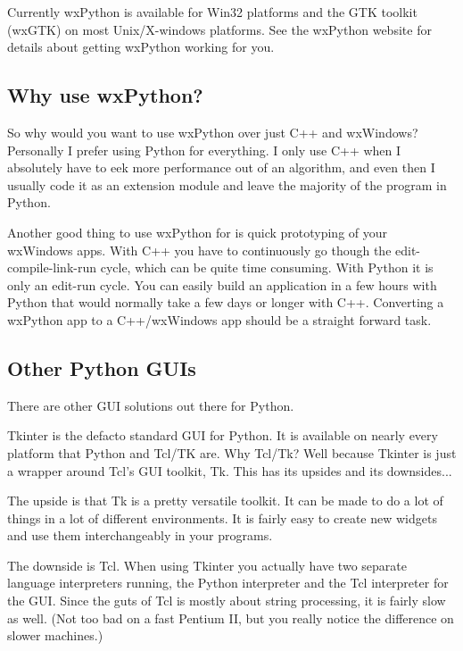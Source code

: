 Currently wxPython is available for Win32 platforms and the GTK
toolkit (wxGTK) on most Unix/X-windows platforms. See the wxPython
website  for
details about getting wxPython working for you.

\subsection{Why use wxPython?}\label{wxpwhy}

So why would you want to use wxPython over just C++ and wxWindows?
Personally I prefer using Python for everything. I only use C++ when I
absolutely have to eek more performance out of an algorithm, and even
then I usually code it as an extension module and leave the majority
of the program in Python.

Another good thing to use wxPython for is quick prototyping of your
wxWindows apps. With C++ you have to continuously go though the
edit-compile-link-run cycle, which can be quite time consuming. With
Python it is only an edit-run cycle. You can easily build an
application in a few hours with Python that would normally take a few
days or longer with C++. Converting a wxPython app to a C++/wxWindows app
should be a straight forward task.

\subsection{Other Python GUIs}\label{wxpother}

There are other GUI solutions out there for Python.


Tkinter is the defacto standard GUI for Python. It is available
on nearly every platform that Python and Tcl/TK are. Why Tcl/Tk?
Well because Tkinter is just a wrapper around Tcl's GUI toolkit, Tk.
This has its upsides and its downsides...

The upside is that Tk is a pretty versatile toolkit. It can be made
to do a lot of things in a lot of different environments. It is fairly
easy to create new widgets and use them interchangeably in your
programs.

The downside is Tcl. When using Tkinter you actually have two
separate language interpreters running, the Python interpreter and the
Tcl interpreter for the GUI. Since the guts of Tcl is mostly about
string processing, it is fairly slow as well. (Not too bad on a fast
Pentium II, but you really notice the difference on slower machines.)

